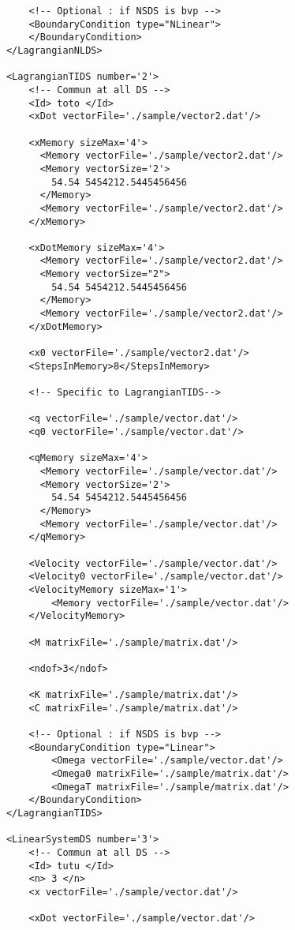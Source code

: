 \begin{verbatim}
				<!-- Optional : if NSDS is bvp -->				
				<BoundaryCondition type="NLinear">					
				</BoundaryCondition>
			</LagrangianNLDS>
			
			<LagrangianTIDS number='2'>
				<!-- Commun at all DS -->
				<Id> toto </Id>
				<xDot vectorFile='./sample/vector2.dat'/>				

				<xMemory sizeMax='4'>				
				  <Memory vectorFile='./sample/vector2.dat'/>
				  <Memory vectorSize='2'>
				  	54.54 5454212.5445456456
				  </Memory>
				  <Memory vectorFile='./sample/vector2.dat'/>				  				  
				</xMemory>
				  
				<xDotMemory sizeMax='4'>
				  <Memory vectorFile='./sample/vector2.dat'/>
				  <Memory vectorSize="2">
				  	54.54 5454212.5445456456
				  </Memory>
				  <Memory vectorFile='./sample/vector2.dat'/>				  				  
				</xDotMemory>

				<x0 vectorFile='./sample/vector2.dat'/>
				<StepsInMemory>8</StepsInMemory>				
				
				<!-- Specific to LagrangianTIDS-->
				
				<q vectorFile='./sample/vector.dat'/>
				<q0 vectorFile='./sample/vector.dat'/>

				<qMemory sizeMax='4'>
				  <Memory vectorFile='./sample/vector.dat'/>
				  <Memory vectorSize='2'>
				  	54.54 5454212.5445456456
				  </Memory>
				  <Memory vectorFile='./sample/vector.dat'/>				  				  
				</qMemory>								
				
				<Velocity vectorFile='./sample/vector.dat'/>
				<Velocity0 vectorFile='./sample/vector.dat'/>
				<VelocityMemory sizeMax='1'>
					<Memory vectorFile='./sample/vector.dat'/>
				</VelocityMemory>

				<M matrixFile='./sample/matrix.dat'/>				
				
				<ndof>3</ndof>
				
				<K matrixFile='./sample/matrix.dat'/>
				<C matrixFile='./sample/matrix.dat'/>			

				<!-- Optional : if NSDS is bvp -->
				<BoundaryCondition type="Linear">
					<Omega vectorFile='./sample/vector.dat'/>
					<Omega0 matrixFile='./sample/matrix.dat'/>
					<OmegaT matrixFile='./sample/matrix.dat'/>				
				</BoundaryCondition>
			</LagrangianTIDS>		

			<LinearSystemDS number='3'>
				<!-- Commun at all DS -->
				<Id> tutu </Id>
				<n> 3 </n>
				<x vectorFile='./sample/vector.dat'/>
				
				<xDot vectorFile='./sample/vector.dat'/>				
				

\end{verbatim}
